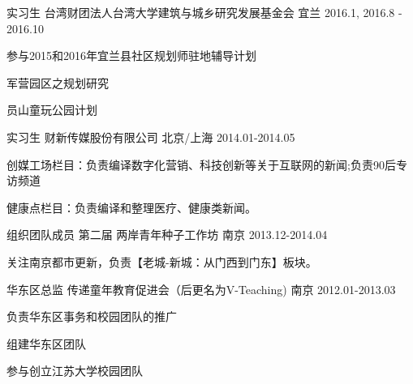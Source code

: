 \begin{cventries}
  \cventry
    {实习生}
    {台湾财团法人台湾大学建筑与城乡研究发展基金会}
    {宜兰}
    {2016.1, 2016.8 - 2016.10}
    {
      \begin{cvitems}           
        \item{ 参与2015和2016年宜兰县社区规划师驻地辅导计划}
		\item{军营园区之规划研究}
		\item{员山童玩公园计划}
       \end{cvitems}
      }
      
      
   \cventry
    {实习生}
    {财新传媒股份有限公司}
    {北京/上海}
    {2014.01-2014.05}
    {
      \begin{cvitems}           
        \item{创媒工场栏目：负责编译数字化营销、科技创新等关于互联网的新闻;负责90后专访频道}
		\item{健康点栏目：负责编译和整理医疗、健康类新闻。}
		\end{cvitems}
      }
        
   \cventry
    {组织团队成员}
    {第二届 两岸青年种子工作坊}
    {南京}
    {2013.12-2014.04}
    {
      \begin{cvitems}           
        \item{关注南京都市更新，负责【老城-新城：从门西到门东】板块。}
		\end{cvitems}
     }	
     
   \cventry
    {华东区总监}
    {传递童年教育促进会（后更名为V-Teaching)}
    {南京}
    {2012.01-2013.03}
    {
      \begin{cvitems}           
        \item{负责华东区事务和校园团队的推广}
        \item{组建华东区团队}
        \item{参与创立江苏大学校园团队}
		\end{cvitems}
      }		 
        		 

        
\end{cventries}
